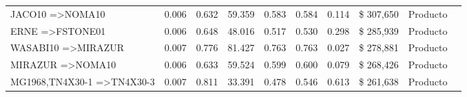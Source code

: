 \documentclass[]{article}
\begin{document}
\begin{landscape}
\begin{table}[htbp]
\begin{tabular}{llllllllll}
				{JACO10} =\textgreater {NOMA10} & 0.006 & 0.632 & 59.359 & 0.583 & 0.584 & 0.114 &  \$       307,650  & Producto \\
				{ERNE} =\textgreater {FSTONE01} & 0.006 & 0.648 & 48.016 & 0.517 & 0.530 & 0.298 &  \$       285,939  & Producto \\
				{WASABI10} =\textgreater {MIRAZUR} & 0.007 & 0.776 & 81.427 & 0.763 & 0.763 & 0.027 &  \$       278,881  & Producto \\
				{MIRAZUR} =\textgreater {NOMA10} & 0.006 & 0.633 & 59.524 & 0.599 & 0.600 & 0.079 &  \$       268,426  & Producto \\
				{MG1968,TN4X30-1} =\textgreater {TN4X30-3} & 0.007 & 0.811 & 33.391 & 0.478 & 0.546 & 0.613 &  \$       261,638  & Producto \\
			\end{tabular}%
			\label{Tab_Reg_Monto}%
		\end{table}%
	\end{landscape}
	\restoregeometry
	
	
	
\end{document}
